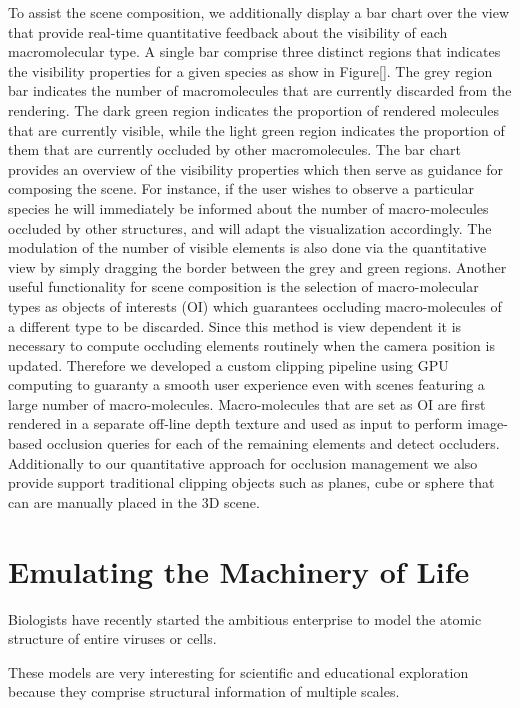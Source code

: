 To assist the scene composition, we additionally display a bar chart over the view that provide real-time quantitative feedback about the visibility of each macromolecular type.
A single bar comprise three distinct regions that indicates the visibility properties for a given species as show in Figure[].
The grey region bar indicates the number of macromolecules that are currently discarded from the rendering.
The dark green region indicates the proportion of rendered molecules that are currently visible, while the light green region indicates the proportion of them that are currently occluded by other macromolecules.
The bar chart provides an overview of the visibility properties which then serve as guidance for composing the scene.
For instance, if the user wishes to observe a particular species he will immediately be informed about the number of macro-molecules occluded by other structures, and will adapt the visualization accordingly.
The modulation of the number of visible elements is also done via the quantitative view by simply dragging the border between the grey and green regions. 
Another useful functionality for scene composition is the selection of macro-molecular types as objects of interests (OI) which guarantees occluding macro-molecules of a different type to be discarded.
Since this method is view dependent it is necessary to compute occluding elements routinely when the camera position is updated.
Therefore we developed a custom clipping pipeline using GPU computing to guaranty a smooth user experience even with scenes featuring a large number of macro-molecules.
Macro-molecules that are set as OI are first rendered in a separate off-line depth texture and used as input to perform image-based occlusion queries for each of the remaining elements and detect occluders.
Additionally to our quantitative approach for occlusion management we also provide support traditional clipping objects such as planes, cube or sphere that can are manually placed in the 3D scene.

\section{Emulating the Machinery of Life}

Biologists have recently started the ambitious enterprise to model the atomic structure of entire viruses or cells.

These models are very interesting for scientific and educational exploration because they comprise structural information of multiple scales.

